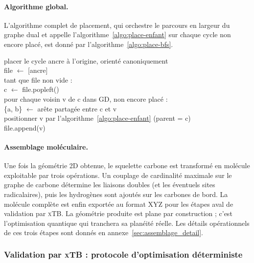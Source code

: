 \documentclass[11pt,a4paper]{article}
\newcommand{\xtb}{\textsc{xTB}}
\begin{document}
\paragraph{Algorithme global.}
L'algorithme complet de placement, qui orchestre le parcours en
largeur du graphe dual et appelle l'algorithme~\ref{algo:place-enfant}
sur chaque cycle non encore placé, est donné par
l'algorithme~\ref{algo:place-bfs}.

\begin{algorithm}[h]
\small\ttfamily
placer le cycle ancre à l'origine, orienté canoniquement\\
file $\leftarrow$ [ancre]\\
tant que file non vide :\\
\phantom{xxxx} c $\leftarrow$ file.popleft()\\
\phantom{xxxx} pour chaque voisin v de c dans GD, non encore placé :\\
\phantom{xxxxxxxx} \{a, b\} $\leftarrow$ arête partagée entre c et v\\
\phantom{xxxxxxxx} positionner v par l'algorithme~\ref{algo:place-enfant} (parent = c)\\
\phantom{xxxxxxxx} file.append(v)
\caption{Placement géométrique global par parcours en largeur du graphe dual.}
\label{algo:place-bfs}
\end{algorithm}

\paragraph{Assemblage moléculaire.}
\label{sec:assemblage}

Une fois la géométrie 2D obtenue, le squelette carbone est transformé en molécule exploitable par trois opérations. Un couplage de cardinalité maximale sur le graphe de carbone détermine les liaisons doubles (et les éventuels sites radicalaires), puis les hydrogènes sont ajoutés sur les carbones de bord. La molécule complète est enfin exportée au format XYZ pour les étapes aval de validation par \xtb{}. La géométrie produite est plane par construction ; c'est l'optimisation quantique qui tranchera sa planéité réelle. Les détails opérationnels de ces trois étapes sont donnés en annexe~\ref{sec:assemblage_detail}.

\subsubsection{Validation par \xtb{} : protocole d'optimisation déterministe}
\label{sec:md}
\end{document}
